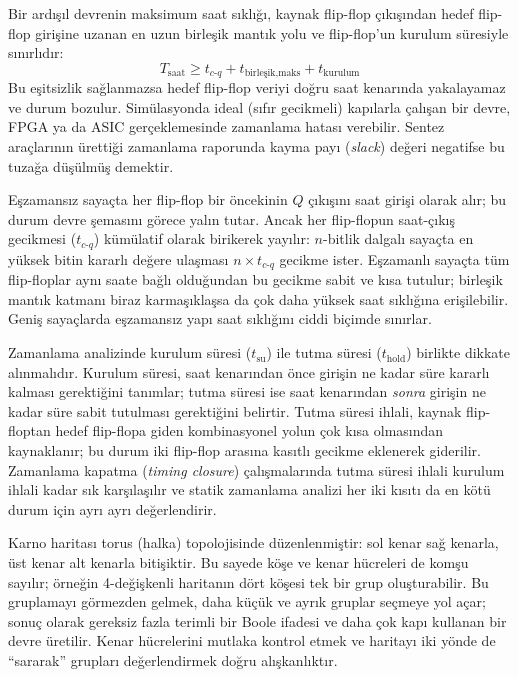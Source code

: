 Bir ardışıl devrenin maksimum saat sıklığı, kaynak flip-flop çıkışından hedef flip-flop girişine uzanan en uzun birleşik mantık yolu ve flip-flop'un kurulum süresiyle sınırlıdır:
\[
T_{\text{saat}} \geq t_{c\text{-}q} + t_{\text{birleşik,maks}} + t_{\text{kurulum}}
\]
Bu eşitsizlik sağlanmazsa hedef flip-flop veriyi doğru saat kenarında yakalayamaz ve durum bozulur. Simülasyonda ideal (sıfır gecikmeli) kapılarla çalışan bir devre, FPGA ya da ASIC gerçeklemesinde zamanlama hatası verebilir. Sentez araçlarının ürettiği zamanlama raporunda kayma payı (\emph{slack}) değeri negatifse bu tuzağa düşülmüş demektir.

Eşzamansız sayaçta her flip-flop bir öncekinin $Q$ çıkışını saat girişi olarak alır; bu durum devre şemasını görece yalın tutar. Ancak her flip-flopun saat-çıkış gecikmesi ($t_{c\text{-}q}$) kümülatif olarak birikerek yayılır: $n$-bitlik dalgalı sayaçta en yüksek bitin kararlı değere ulaşması $n \times t_{c\text{-}q}$ gecikme ister. Eşzamanlı sayaçta tüm flip-floplar aynı saate bağlı olduğundan bu gecikme sabit ve kısa tutulur; birleşik mantık katmanı biraz karmaşıklaşsa da çok daha yüksek saat sıklığına erişilebilir. Geniş sayaçlarda eşzamansız yapı saat sıklığını ciddi biçimde sınırlar.

Zamanlama analizinde kurulum süresi ($t_{\text{su}}$) ile tutma süresi ($t_{\text{hold}}$) birlikte dikkate alınmalıdır. Kurulum süresi, saat kenarından önce girişin ne kadar süre kararlı kalması gerektiğini tanımlar; tutma süresi ise saat kenarından \emph{sonra} girişin ne kadar süre sabit tutulması gerektiğini belirtir. Tutma süresi ihlali, kaynak flip-floptan hedef flip-flopa giden kombinasyonel yolun çok kısa olmasından kaynaklanır; bu durum iki flip-flop arasına kasıtlı gecikme eklenerek giderilir. Zamanlama kapatma (\emph{timing closure}) çalışmalarında tutma süresi ihlali kurulum ihlali kadar sık karşılaşılır ve statik zamanlama analizi her iki kısıtı da en kötü durum için ayrı ayrı değerlendirir.

Karno haritası torus (halka) topolojisinde düzenlenmiştir: sol kenar sağ kenarla, üst kenar alt kenarla bitişiktir. Bu sayede köşe ve kenar hücreleri de komşu sayılır; örneğin 4-değişkenli haritanın dört köşesi tek bir grup oluşturabilir. Bu gruplamayı görmezden gelmek, daha küçük ve ayrık gruplar seçmeye yol açar; sonuç olarak gereksiz fazla terimli bir Boole ifadesi ve daha çok kapı kullanan bir devre üretilir. Kenar hücrelerini mutlaka kontrol etmek ve haritayı iki yönde de ``sararak'' grupları değerlendirmek doğru alışkanlıktır.

